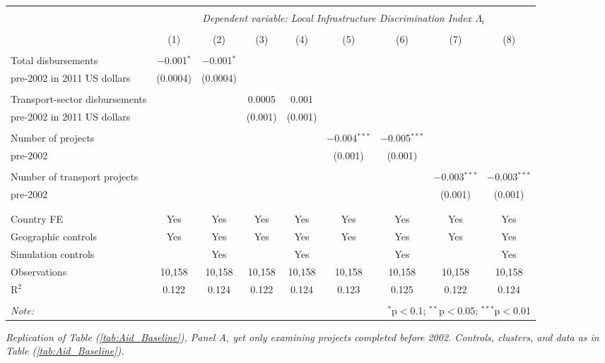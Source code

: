 \documentclass[11pt, oneside]{article}   	%
\let\oldref\ref
\renewcommand{\ref}[1]{(\oldref{#1})}
\newcommand{\mysubcaption}[1]{
\justify
\begin{spacing}{0.7}
\textit{\footnotesize #1}
\end{spacing}}
\begin{document}
\begin{spacing}{1.3}
\begin{table}[h]
{  \begin{tabular}{@{\extracolsep{5pt}}lcccccccc}
  \\[-1.8ex]\hline
  \hline \\[-1.8ex]
   & \multicolumn{8}{c}{\textit{Dependent variable: Local Infrastructure Discrimination Index $\Lambda_{i}$}} \\
  \cline{2-9}
  \\[-1.8ex] & (1) & (2) & (3) & (4) & (5) & (6) & (7) & (8)\\
  \hline \\[-1.8ex]
  Total disbursements & $-$0.001$^{*}$ & $-$0.001$^{*}$ &  &  &  &  &  &  \\
   \hspace*{3mm} pre-2002 in 2011 US dollars & (0.0004) & (0.0004) &  &  &  &  &  &  \\
   & & & & & & & & \\
  Transport-sector disbursements &  &  & 0.0005 & 0.001 &  &  &  &  \\
   \hspace*{3mm} pre-2002 in 2011 US dollars &  &  & (0.001) & (0.001) &  &  &  &  \\
   & & & & & & & & \\
  Number of projects &  &  &  &  & $-$0.004$^{***}$ & $-$0.005$^{***}$ &  &  \\
   \hspace*{3mm} pre-2002 &  &  &  &  & (0.001) & (0.001) &  &  \\
   & & & & & & & & \\
  Number of transport projects &  &  &  &  &  &  & $-$0.003$^{***}$ & $-$0.003$^{***}$ \\
   \hspace*{3mm} pre-2002 &  &  &  &  &  &  & (0.001) & (0.001) \\
   & & & & & & & & \\
 \hline \\[-1.8ex]
 Country FE & Yes & Yes & Yes & Yes & Yes & Yes & Yes & Yes \\
 Geographic controls & Yes & Yes & Yes & Yes & Yes & Yes & Yes & Yes \\
 Simulation controls &  & Yes &  & Yes &  & Yes &  & Yes \\
 Observations & 10,158 & 10,158 & 10,158 & 10,158 & 10,158 & 10,158 & 10,158 & 10,158 \\
 R$^{2}$ & 0.122 & 0.124 & 0.122 & 0.124 & 0.123 & 0.125 & 0.122 & 0.124 \\
 \hline
 \hline \\[-1.8ex]
 \textit{Note:}  & \multicolumn{8}{r}{$^{*}$p$<$0.1; $^{**}$p$<$0.05; $^{***}$p$<$0.01} \\
 \end{tabular}

}

\mysubcaption{Replication of Table \ref{tab:Aid_Baseline}, Panel A, yet only examining projects completed before 2002. Controls, clusters, and data as in Table \ref{tab:Aid_Baseline}.}
\end{table}

\end{spacing}
\end{document}
